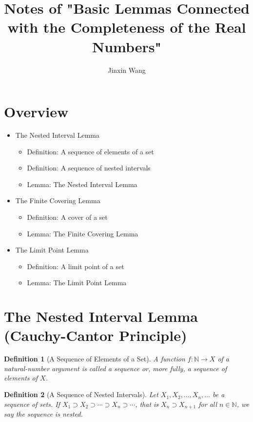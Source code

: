 \documentclass[onecolumn]{ctexart}
\title{Notes of "Basic Lemmas Connected with the Completeness of the Real Numbers"}
\author{Jinxin Wang}
\date{}
\newtheorem{definition}{Definition}
\begin{document}
\maketitle

\section{Overview}
\begin{itemize}
  \item The Nested Interval Lemma
  \begin{itemize}
    \item Definition: A sequence of elements of a set
    \item Definition: A sequence of nested intervals
    \item Lemma: The Nested Interval Lemma
  \end{itemize}
  \item The Finite Covering Lemma
  \begin{itemize}
    \item Definition: A cover of a set
    \item Lemma: The Finite Covering Lemma
  \end{itemize}
  \item The Limit Point Lemma
  \begin{itemize}
    \item Definition: A limit point of a set
    \item Lemma: The Limit Point Lemma
  \end{itemize}
\end{itemize}

\section{The Nested Interval Lemma (Cauchy-Cantor Principle)}

\begin{definition}[A Sequence of Elements of a Set]
  A function $f: \mathbb{N} \to X$ of a natural-number argument is called a 
  sequence or, more fully, a sequence of elements of $X$.
\end{definition}

\begin{definition}[A Sequence of Nested Intervals]
  Let $X_1, X_2, \ldots, X_n, \ldots$ be a sequence of sets. If $X_1 \supset X_2 
  \supset \cdots \supset X_n \supset \cdots$, that is $X_n \supset X_{n+1}$ for 
  all $n \in \mathbb{N}$, we say the sequence is nested.
\end{definition}
\end{document}
